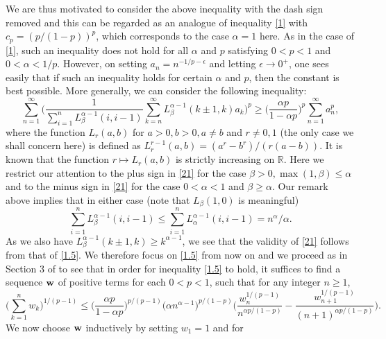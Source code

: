 \documentclass[11pt]{amsart}
\numberwithin{equation}{section}
\theoremstyle{definition}
\theoremstyle{remark}
\begin{document}
    We are thus motivated to consider the above inequality with the dash sign removed and this can be regarded as an analogue of
    inequality \eqref{1} with $c_p=(p/(1-p))^p$, which corresponds to the case $\alpha=1$ here. As in the case of
\eqref{1}, such an inequality
   does not hold for all $\alpha$ and $p$ satisfying $0<p<1$ and
   $0< \alpha <1/p$. However, on setting $a_n=n^{-1/p-\epsilon}$ and
   letting $\epsilon \rightarrow 0^+$, one sees easily that if
   such an inequality holds for
   certain $\alpha$ and $p$, then the constant is best possible. More generally, we can consider the following inequality:
\begin{equation}
\label{21}
 \sum^{\infty}_{n=1}\Big ( \frac
1{\sum^n_{i=1}L^{\alpha-1}_{\beta}(i,
i-1)}\sum^{\infty}_{k=n}L^{\alpha-1}_{\beta}(k \pm 1, k)a_k \Big
)^p \geq \Big ( \frac {\alpha p}{1-\alpha p} \Big
)^p\sum^{\infty}_{n=1}a_n^p,
\end{equation}
   where the function $L_r(a,b)$ for $a>0, b>0, a \neq b$ and $r \neq 0, 1$ (the only case we shall concern here) is defined
   as $L^{r-1}_r(a,b)=(a^r-b^r)/(r(a-b))$. It is known \cite[Lemma 2.1]{alz1.5} that
   the function $r \mapsto L_r(a,b)$ is strictly increasing on ${\mathbb
   R}$. Here we restrict our attention to the plus sign in \eqref{21} for the case
   $\beta>0, \max (1, \beta) \leq \alpha$ and to the minus sign in \eqref{21} for the case $0<
   \alpha <1$ and $\beta \geq \alpha$. Our remark above implies
   that in either case (note that $L_{\beta}(1,0)$ is meaningful)
\begin{equation*}
  \sum^n_{i=1}L^{\alpha-1}_{\beta}(i,
i-1) \leq  \sum^n_{i=1}L^{\alpha-1}_{\alpha}(i,
i-1)=n^{\alpha}/\alpha.
\end{equation*}
   As we also have $L^{\alpha-1}_{\beta}(k \pm 1, k) \geq
   k^{\alpha-1}$, we see that the validity of \eqref{21} follows
   from that of \eqref{1.5}. We therefore focus on \eqref{1.5}
   from now on and we proceed as in Section 3 of \cite{G6} to see that in order
   for inequality \eqref{1.5} to hold, it suffices to find
  a sequence ${\bf w}$ of positive terms for each $0<p < 1$, such
  that for any integer $n \geq 1$,
\begin{equation}
\label{35}
  \Big(\sum^n_{k=1}w_k \Big )^{1/(p-1)} \leq
 \Big (\frac {\alpha p}{1-\alpha p} \Big )^{p/(p-1)}\Big (\alpha n^{\alpha-1} \Big )^{p/(1-p)}
 \Big( \frac {w^{1/(p-1)}_n}{n^{\alpha p/(1-p)}}- \frac
 {w^{1/(p-1)}_{n+1}}{(n+1)^{\alpha p/(1-p)}}\Big).
\end{equation}
   We now choose ${\bf w}$ inductively by setting $w_1=1$ and for
\end{document}
